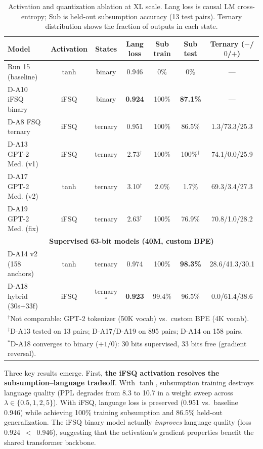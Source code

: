 \documentclass[11pt,a4paper]{article}
\begin{document}
\begin{table}[h]
\centering
\caption{Activation and quantization ablation at XL scale. Lang loss is causal LM cross-entropy; Sub is held-out subsumption accuracy (13 test pairs). Ternary distribution shows the fraction of outputs in each state.}
\label{tab:ternary}
\small
\begin{tabular}{lcccccc}
\toprule
Model & Activation & States & Lang loss & Sub train & Sub test & Ternary ($-$/$0$/$+$) \\
\midrule
Run 15 (baseline) & $\tanh$ & binary & 0.946 & 0\% & 0\% & --- \\
D-A10 iFSQ binary & iFSQ & binary & \textbf{0.924} & 100\% & \textbf{87.1\%} & --- \\
D-A8 FSQ ternary & iFSQ & ternary & 0.951 & 100\% & 86.5\% & 1.3/73.3/25.3 \\
\midrule
D-A13 GPT-2 Med. (v1) & iFSQ & ternary & 2.73$^\dagger$ & 100\% & 100\%$^\ddagger$ & 74.1/0.0/25.9 \\
D-A17 GPT-2 Med. (v2) & tanh & ternary & 3.10$^\dagger$ & 2.0\% & 1.7\% & 69.3/3.4/27.3 \\
D-A19 GPT-2 Med. (fix) & iFSQ & ternary & 2.63$^\dagger$ & 100\% & 76.9\% & 70.8/1.0/28.2 \\
\midrule
\multicolumn{7}{c}{\textbf{Supervised 63-bit models (40M, custom BPE)}} \\
\midrule
D-A14 v2 (158 anchors) & tanh & ternary & 0.974 & 100\% & \textbf{98.3\%} & 28.6/41.3/30.1 \\
D-A18 hybrid (30s+33f) & iFSQ & ternary$^*$ & \textbf{0.923} & 99.4\% & 96.5\% & 0.0/61.4/38.6 \\
\bottomrule
\multicolumn{7}{l}{\footnotesize $^\dagger$Not comparable: GPT-2 tokenizer (50K vocab) vs.\ custom BPE (4K vocab).} \\
\multicolumn{7}{l}{\footnotesize $^\ddagger$D-A13 tested on 13 pairs; D-A17/D-A19 on 895 pairs; D-A14 on 158 pairs.} \\
\multicolumn{7}{l}{\footnotesize $^*$D-A18 converges to binary ($+1$/$0$): 30 bits supervised, 33 bits free (gradient reversal).}
\end{tabular}
\end{table}

Three key results emerge. First, \textbf{the iFSQ activation resolves the subsumption--language tradeoff}. With $\tanh$, subsumption training destroys language quality (PPL degrades from 8.3 to 10.7 in a weight sweep across $\lambda \in \{0.5, 1, 2, 5\}$). With iFSQ, language loss is preserved (0.951 vs.\ baseline 0.946) while achieving 100\% training subsumption and 86.5\% held-out generalization. The iFSQ binary model actually \emph{improves} language quality (loss 0.924~$<$~0.946), suggesting that the activation's gradient properties benefit the shared transformer backbone.
\end{document}
